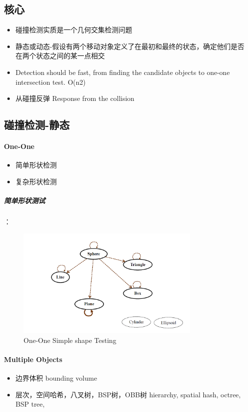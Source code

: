 \documentclass[UTF8,a4paper,8pt]{ctexart}
\begin{document}
		\subsection{核心}
			\begin{itemize}
				\item 碰撞检测实质是一个几何交集检测问题
				\item 静态或动态-假设有两个移动对象定义了在最初和最终的状态，确定他们是否在两个状态之间的某一点相交
				\item Detection should be fast, from finding the candidate objects to one-one intersection test. O(n2)
				\item 从碰撞反弹 Response from the collision
			\end{itemize}
		
		\subsection{碰撞检测-静态}
			\paragraph{One-One}
				\begin{itemize}
					\item 简单形状检测
					\item 复杂形状检测
				\end{itemize}
				\subparagraph{简单形状测试}：
					\begin{figure}[h]
						\centering
						\caption{One-One Simple shape Testing}
						\includegraphics[width=9cm]{simpleShape.png}
					\end{figure}
			\paragraph{Multiple Objects}
				\begin{itemize}
					\item 边界体积 bounding volume
					\item 层次，空间哈希，八叉树，BSP树，OBB树  hierarchy, spatial hash, octree, BSP tree,
				\end{itemize}
				
\end{document}
